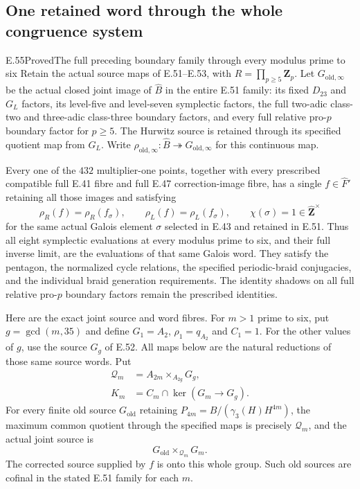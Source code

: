 \subsection{One retained word through the whole congruence system}

\begin{statement}{E.55}{Proved}{The full preceding boundary family through every modulus prime to six}
Retain the actual source maps of E.51--E.53, with
$R=\prod_{p\geq5}\mathbf Z_p$.
Let $G_{\mathrm{old},\infty}$ be the actual closed joint
image of $\widehat B$ in the entire E.51 family: its
fixed $D_{23}$ and $G_L$ factors, its level-five and
level-seven symplectic factors, the full two-adic
class-two and three-adic class-three boundary factors,
and every full relative pro-$p$ boundary factor for
$p\geq5$. The Hurwitz source is retained through its
specified quotient map from $G_L$.
Write
$\rho_{\mathrm{old},\infty}:\widehat B\twoheadrightarrow
G_{\mathrm{old},\infty}$ for this continuous map.

Every one of the $432$ multiplier-one points, together
with every prescribed compatible full E.41 fibre and
full E.47 correction-image fibre, has a single
$f\in\widehat F'$ retaining all those images and
satisfying
\[
 \rho_R(f)=\rho_R(f_\sigma),\qquad
 \rho_L(f)=\rho_L(f_\sigma),\qquad
 \chi(\sigma)=1\in\widehat{\mathbf Z}^{\times}
 \tag{E.55.1}
\]
for the same actual Galois element $\sigma$ selected
in E.43 and retained in E.51.
Thus all eight symplectic evaluations at every
modulus prime to six, and their full inverse limit,
are the evaluations of that same Galois word.
They satisfy the pentagon, the normalized cycle
relations, the specified periodic-braid conjugacies,
and the individual braid generation requirements.
The identity shadows on all full relative pro-$p$
boundary factors remain the prescribed identities.

Here are the exact joint source and word fibres.
For $m>1$ prime to six, put $g=\gcd(m,35)$ and define
$G_1=A_2$, $\rho_1=q_{A_2}$ and $C_1=1$.
For the other values of $g$, use the source $G_g$
of E.52. All maps below are the natural reductions
of those same source words. Put
\[
 \begin{split}
 \mathcal Q_m&=A_{2m}\mathbin{\times_{A_{2g}}}G_g,\\
 K_m&=C_m\cap\ker(G_m\longrightarrow G_g).
 \end{split}
 \tag{E.55.2}
\]
For every finite old source $G_{\mathrm{old}}$ retaining
$P_{4m}=B/(\gamma_3(H)H^{4m})$, the maximum common
quotient through the specified maps is precisely
$\mathcal Q_m$, and the actual joint source is
\[
       G_{\mathrm{old}}\mathbin{\times_{\mathcal Q_m}}G_m.
 \tag{E.55.3}
\]
The corrected source supplied by $f$ is onto this
whole group. Such old sources are cofinal in the
stated E.51 family for each $m$.


\end{statement}

